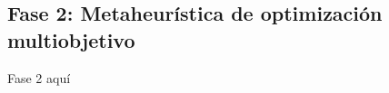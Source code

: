 \subsection{Fase 2: Metaheurística de optimización multiobjetivo} \label{sec:3:metaheurística}
Fase 2 aquí